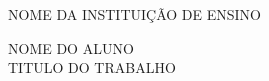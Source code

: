 

\section*{}
\thispagestyle{empty}       %
\vspace{-1 cm}              %

\begin{center}
	\large{NOME DA INSTITUIÇÃO DE ENSINO}


	\vspace{3 cm}

	\vspace{4.5 cm}



	\vspace{\parskip}
	{\large NOME DO ALUNO}\\                   %
	\vspace{\parskip}
	{\large TITULO DO TRABALHO}\\    %



	\vspace{3 cm}


	\vspace{9 cm}

	\\
	\vspace{1 cm}
	\\
\end{center}
\newpage
